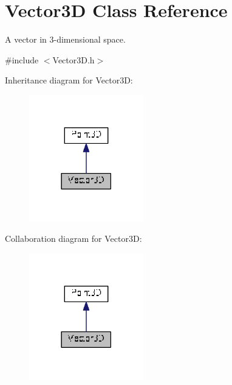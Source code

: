 \hypertarget{class_vector3_d}{\section{Vector3\+D Class Reference}
\label{class_vector3_d}
}


A vector in 3-\/dimensional space.  




{\ttfamily \#include $<$Vector3\+D.\+h$>$}



Inheritance diagram for Vector3\+D\+:\nopagebreak
\begin{figure}[H]
\begin{center}
\leavevmode
\includegraphics[width=141pt]{class_vector3_d__inherit__graph}
\end{center}
\end{figure}


Collaboration diagram for Vector3\+D\+:\nopagebreak
\begin{figure}[H]
\begin{center}
\leavevmode
\includegraphics[width=141pt]{class_vector3_d__coll__graph}
\end{center}
\end{figure}
